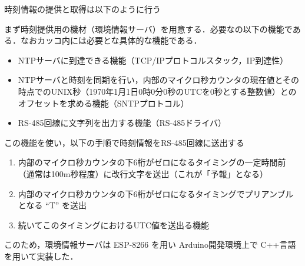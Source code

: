 

 \par

時刻情報の提供と取得は以下のように行う

まず時刻提供用の機材（環境情報サーバ）を用意する．必要なの以下の機能である．なおカッコ内には必要とな具体的な機能である．

\begin{itemize}
\item NTPサーバに到達できる機能（TCP/IPプロトコルスタック，IP到達性）
\item NTPサーバと時刻を同期を行い，内部のマイクロ秒カウンタの現在値とその時点でのUNIX秒（1970年1月1日0時0分0秒のUTCを0秒とする整数値）とのオフセットを求める機能（SNTPプロトコル）
\item RS-485回線に文字列を出力する機能（RS-485ドライバ）
\end{itemize}

この機能を使い，以下の手順で時刻情報をRS-485回線に送出する

\begin{enumerate}
\item 内部のマイクロ秒カウンタの下6桁がゼロになるタイミングの一定時間前（通常は100m秒程度）に改行文字を送出（これが「予報」となる）
\item 内部のマイクロ秒カウンタの下6桁がゼロになるタイミングでプリアンブルとなる ``T'' を送出
\item 続いてこのタイミングにおけるUTC値を送出る機能
\end{enumerate}

このため，環境情報サーバは ESP-8266 を用い Arduino開発環境上で C++言語を用いて実装した．\\


